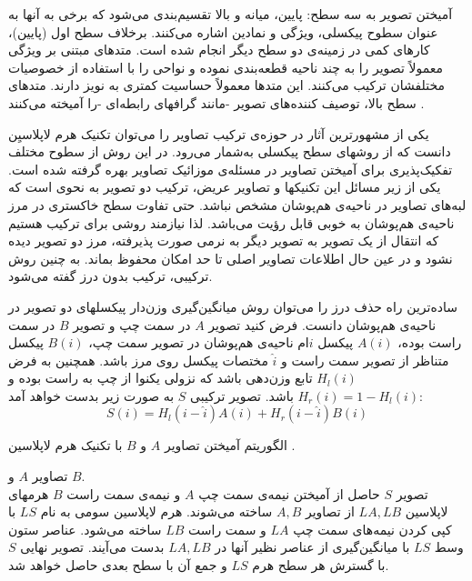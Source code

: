 \documentclass[11pt,a4paper,twocolumn]{article}
\numberwithin{table}{section}
\begin{document}
آمیختن تصویر به سه سطح: پایین، میانه و بالا تقسیم‌بندی می‌شود که برخی به آنها به عنوان سطوح پیکسلی، ویژگی 
و نمادین اشاره می‌کنند. برخلاف  سطح اول (پایین)، کارهای کمی  در زمینه‌ی
دو سطح دیگر انجام شده است. متدهای مبتنی بر ویژگی معمولاً تصویر را به چند ناحیه قطعه‌بندی نموده و 
نواحی را با استفاده از خصوصیات مختلفشان ترکیب می‌کنند. این متدها معمولاً حساسیت کمتری به نویز دارند.
متدهای سطح بالا، توصیف کننده‌های تصویر -مانند گرافهای رابطه‌ای
-را آمیخته می‌کنند
\cite{Goshtasby07image}.%

یکی از مشهورترین آثار در حوزه‌ی ترکیب تصاویر را می‌توان تکنیک هرم لاپلاسیِن \cite{Burt83multiresolution} دانست که از روشهای سطح پیکسلی به‌شمار می‌رود. در این روش از سطوح مختلف تفکیک‌پذیری برای آمیختن تصاویر در مسئله‌ی موزائیک تصاویر بهره گرفته شده است. 
یکی از زیر مسائل این تکنیکها و تصاویر عریض، ترکیب دو تصویر به نحوی است که لبه‌های تصاویر در ناحیه‌ی هم‌پوشان مشخص نباشد.  حتی تفاوت سطح خاکستری در مرز ناحیه‌ی هم‌پوشان به خوبی قابل رؤیت می‌باشد. لذا نیازمند روشی برای ترکیب هستیم که انتقال از یک تصویر به تصویر دیگر به نرمی صورت پذیرفته، مرز دو تصویر دیده نشود و در عین حال اطلاعات تصاویر اصلی تا حد امکان محفوظ بماند. به چنین روش ترکیبی، ترکیب بدون درز گفته می‌شود.

ساده‌ترین راه حذف درز را می‌توان روش میانگین‌گیری وزن‌دار پیکسلهای دو تصویر در ناحیه‌ی هم‌پوشان دانست. فرض کنید تصویر $A$ در سمت چپ و تصویر $B$ در سمت راست بوده، $A(i)$ پیکسل $i$ام ناحیه‌ی هم‌پوشان در تصویر سمت چپ، $B(i)$ پیکسل متناظر از تصویر سمت راست و $\hat{i}$ مختصات پیکسل روی مرز باشد. همچنین به فرض $H_l(i)$ تابع وزن‌دهی باشد که نزولی یکنوا از چپ به راست بوده و $H_r(i) = 1-H_l(i)$ باشد. تصویر ترکیبی $S$ به صورت زیر بدست خواهد آمد:
\begin{equation}
S(i) = H_l(i-\hat{i})A(i) + H_r(i-\hat{i})B(i)
\end{equation}

\begin{algorithm}[t]
\caption{الگوریتم آمیختن تصاویر $A$ و $B$  با تکنیک هرم لاپلاسین \cite{Burt83multiresolution}.} \label{alg1}
\begin{algorithmic}[1]
\REQUIRE تصاویر $A$ و $B$.\\
\ENSURE تصویر $S$ حاصل از آمیختن نیمه‌ی سمت چپ $A$ و نیمه‌ی سمت راست $B$
  \STATE هرمهای لاپلاسین $LA,LB$ از تصاویر $A,B$ ساخته می‌شوند.
  \STATE هرم لاپلاسین سومی به نام $LS$ با کپی کردن نیمه‌های سمت چپ $LA$ و سمت راست $LB$ ساخته می‌شود. عناصر ستون وسط $LS$ با میانگین‌گیری از عناصر نظیر آنها در $LA,LB$ بدست می‌آیند. 
  \STATE تصویر نهایی $S$ با گسترش هر سطح هرم $LS$ و جمع آن با سطح بعدی حاصل خواهد شد.   
\end{algorithmic}
\end{algorithm}
\end{document}
